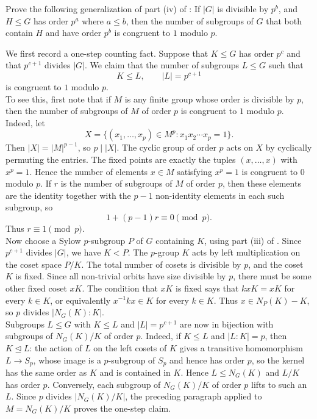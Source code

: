 \documentclass[../Odyssey_Project.tex]{subfiles}
\begin{document}
\begin{exercise}
\label{ex:7.4}
Prove the following generalization of part (iv) of : If $|G|$ is divisible by $p^b$, and $H \leq G$ has order $p^a$ where $a \leq b$, then the number of subgroups of $G$ that both contain $H$ and have order $p^b$ is congruent to $1$ modulo $p$.
\end{exercise}
\begin{solution}
We first record a one-step counting fact. Suppose that $K\leq G$ has order $p^c$ and that $p^{c+1}$ divides $|G|$. We claim that the number of subgroups $L\leq G$ such that
\[
    K\leq L,\qquad |L|=p^{c+1}
\]
is congruent to $1$ modulo $p$.\\
To see this, first note that if $M$ is any finite group whose order is divisible by $p$, then the number of subgroups of $M$ of order $p$ is congruent to $1$ modulo $p$. Indeed, let
\[
    X=\{(x_1,\ldots,x_p)\in M^p:x_1x_2\cdots x_p=1\}.
\]
Then $|X|=|M|^{p-1}$, so $p\mid |X|$. The cyclic group of order $p$ acts on $X$ by cyclically permuting the entries. The fixed points are exactly the tuples $(x,\ldots,x)$ with $x^p=1$. Hence the number of elements $x\in M$ satisfying $x^p=1$ is congruent to $0$ modulo $p$. If $r$ is the number of subgroups of $M$ of order $p$, then these elements are the identity together with the $p-1$ non-identity elements in each such subgroup, so
\[
    1+(p-1)r\equiv 0 \pmod{p}.
\]
Thus $r\equiv 1\pmod{p}$.\\
Now choose a Sylow $p$-subgroup $P$ of $G$ containing $K$, using part (iii) of . Since $p^{c+1}$ divides $|G|$, we have $K<P$. The $p$-group $K$ acts by left multiplication on the coset space $P/K$. The total number of cosets is divisible by $p$, and the coset $K$ is fixed. Since all non-trivial orbits have size divisible by $p$, there must be some other fixed coset $xK$. The condition that $xK$ is fixed says that $kxK=xK$ for every $k\in K$, or equivalently $x^{-1}kx\in K$ for every $k\in K$. Thus $x\in N_P(K)-K$, so $p$ divides $|N_G(K):K|$.\\
Subgroups $L\leq G$ with $K\leq L$ and $|L|=p^{c+1}$ are now in bijection with subgroups of $N_G(K)/K$ of order $p$. Indeed, if $K\leq L$ and $|L:K|=p$, then $K\trianglelefteq L$: the action of $L$ on the left cosets of $K$ gives a transitive homomorphism $L\to S_p$, whose image is a $p$-subgroup of $S_p$ and hence has order $p$, so the kernel has the same order as $K$ and is contained in $K$. Hence $L\leq N_G(K)$ and $L/K$ has order $p$. Conversely, each subgroup of $N_G(K)/K$ of order $p$ lifts to such an $L$. Since $p$ divides $|N_G(K)/K|$, the preceding paragraph applied to $M=N_G(K)/K$ proves the one-step claim.\\

\end{solution}
\end{document}
